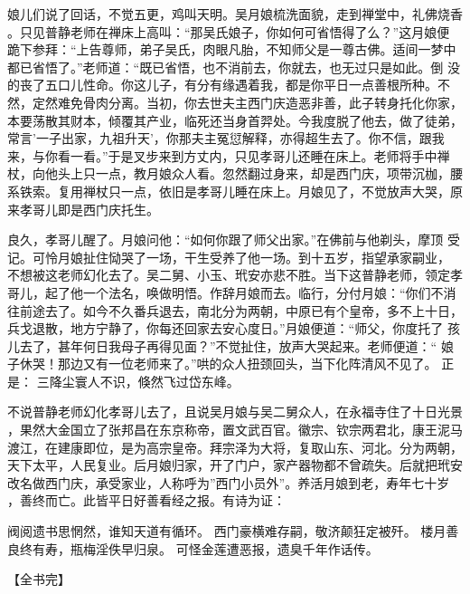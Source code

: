 娘儿们说了回话，不觉五更，鸡叫天明。吴月娘梳洗面貌，走到禅堂中，礼佛烧香
。只见普静老师在禅床上高叫：“那吴氏娘子，你如何可省悟得了么？”这月娘便
跪下参拜：“上告尊师，弟子吴氏，肉眼凡胎，不知师父是一尊古佛。适间一梦中
都已省悟了。”老师道：“既已省悟，也不消前去，你就去，也无过只是如此。倒
没的丧了五口儿性命。你这儿子，有分有缘遇着我，都是你平日一点善根所种。不
然，定然难免骨肉分离。当初，你去世夫主西门庆造恶非善，此子转身托化你家，
本要荡散其财本，倾覆其产业，临死还当身首羿处。今我度脱了他去，做了徒弟，
常言'一子出家，九祖升天'，你那夫主冤愆解释，亦得超生去了。你不信，跟我
来，与你看一看。”于是叉步来到方丈内，只见孝哥儿还睡在床上。老师将手中禅
杖，向他头上只一点，教月娘众人看。忽然翻过身来，却是西门庆，项带沉枷，腰
系铁索。复用禅杖只一点，依旧是孝哥儿睡在床上。月娘见了，不觉放声大哭，原
来孝哥儿即是西门庆托生。

良久，孝哥儿醒了。月娘问他：“如何你跟了师父出家。”在佛前与他剃头，摩顶
受记。可怜月娘扯住恸哭了一场，干生受养了他一场。到十五岁，指望承家嗣业，
不想被这老师幻化去了。吴二舅、小玉、玳安亦悲不胜。当下这普静老师，领定孝
哥儿，起了他一个法名，唤做明悟。作辞月娘而去。临行，分付月娘：“你们不消
往前途去了。如今不久番兵退去，南北分为两朝，中原已有个皇帝，多不上十日，
兵戈退散，地方宁静了，你每还回家去安心度日。”月娘便道：“师父，你度托了
孩儿去了，甚年何日我母子再得见面？”不觉扯住，放声大哭起来。老师便道：“
娘子休哭！那边又有一位老师来了。”哄的众人扭颈回头，当下化阵清风不见了。
正是：  三降尘寰人不识，倏然飞过岱东峰。

不说普静老师幻化孝哥儿去了，且说吴月娘与吴二舅众人，在永福寺住了十日光景
，果然大金国立了张邦昌在东京称帝，置文武百官。徽宗、钦宗两君北，康王泥马
渡江，在建康即位，是为高宗皇帝。拜宗泽为大将，复取山东、河北。分为两朝，
天下太平，人民复业。后月娘归家，开了门户，家产器物都不曾疏失。后就把玳安
改名做西门庆，承受家业，人称呼为”西门小员外”。养活月娘到老，寿年七十岁
，善终而亡。此皆平日好善看经之报。有诗为证：

阀阅遗书思惘然，谁知天道有循环。
西门豪横难存嗣，敬济颠狂定被歼。
楼月善良终有寿，瓶梅淫佚早归泉。
可怪金莲遭恶报，遗臭千年作话传。

【全书完】